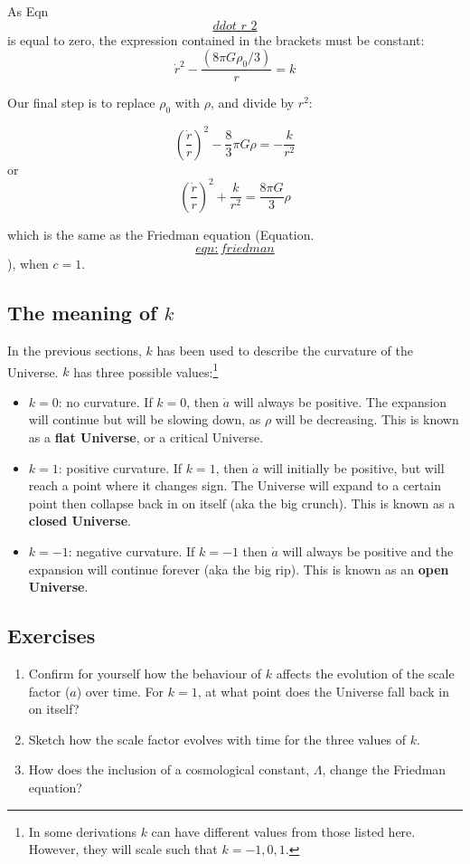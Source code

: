 \documentclass[11pt,a4paper,notoc]{tufte-handout}
\let\rmarkdownfootnote\footnote%
\def\footnote{\protect\rmarkdownfootnote}
\begin{document}
As Eqn~\protect\hyperlink{ddot_r_2}{\[ddot\_r\_2\]} is equal to zero, the expression contained in the
brackets must be constant:
\[\dot{r}^2 - \dfrac{(8\pi G \rho_0 / 3)}{r} = k\]

Our final step is to replace \(\rho_0\) with \(\rho\), and divide by \(r^2\):

\[\left(\dfrac{\dot{r}}{r}\right)^2 - \dfrac{8}{3}\pi G \rho = -\dfrac{k}{r^2}\]
or
\[\left(\dfrac{\dot{r}}{r}\right)^2 + \dfrac{k}{r^2} = \dfrac{8\pi G}{3}\rho\]

which is the same as the Friedman equation
(Equation.~\protect\hyperlink{eqn:friedman}{\[eqn:friedman\]}), when \(c=1\).

\hypertarget{sec:curvature}{%
\subsection{\texorpdfstring{The meaning of \(k\)}{The meaning of k}}\label{sec:curvature}}

In the previous sections, \(k\) has been used to describe the curvature of
the Universe. \(k\) has three possible values:\footnote{In some derivations \(k\) can have different values from those
  listed here. However, they will scale such that \(k = -1, 0, 1\).}

\begin{itemize}
\item
  \(k = 0\): no curvature. If \(k=0\), then \(\dot{a}\) will always be
  positive. The expansion will continue but will be slowing down, as
  \(\rho\) will be decreasing. This is known as a \textbf{flat Universe}, or
  a critical Universe.
\item
  \(k = 1\): positive curvature. If \(k = 1\), then \(\dot{a}\) will
  initially be positive, but will reach a point where it changes sign.
  The Universe will expand to a certain point then collapse back in on
  itself (aka the big crunch). This is known as a \textbf{closed Universe}.
\item
  \(k = -1\): negative curvature. If \(k=-1\) then \(\dot{a}\) will always
  be positive and the expansion will continue forever (aka the big
  rip). This is known as an \textbf{open Universe}.
\end{itemize}

\hypertarget{sec:geometry_ex}{%
\subsection{Exercises}\label{sec:geometry_ex}}

\begin{enumerate}
\def\labelenumi{\arabic{enumi}.}
\item
  Confirm for yourself how the behaviour of \(k\) affects the evolution
  of the scale factor (\(a\)) over time. For \(k=1\), at what point does
  the Universe fall back in on itself?
\item
  Sketch how the scale factor evolves with time for the three values
  of \(k\).
\item
  How does the inclusion of a cosmological constant, \(\Lambda\), change
  the Friedman equation?
\end{enumerate}


\end{document}
